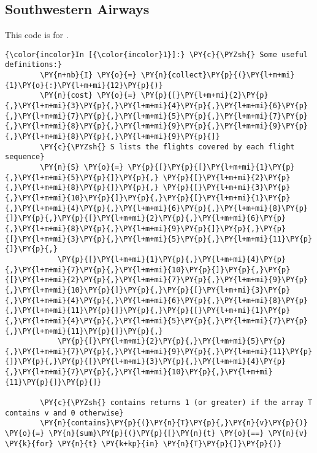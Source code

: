 \subsection{Southwestern Airways}
\label{code:southwestern-airways}
This code is for .

    \begin{Verbatim}[commandchars=\\\{\}]
{\color{incolor}In [{\color{incolor}1}]:} \PY{c}{\PYZsh{} Some useful definitions:}
        \PY{n+nb}{I} \PY{o}{=} \PY{n}{collect}\PY{p}{(}\PY{l+m+mi}{1}\PY{o}{:}\PY{l+m+mi}{12}\PY{p}{)}
        \PY{n}{cost} \PY{o}{=} \PY{p}{[}\PY{l+m+mi}{2}\PY{p}{,}\PY{l+m+mi}{3}\PY{p}{,}\PY{l+m+mi}{4}\PY{p}{,}\PY{l+m+mi}{6}\PY{p}{,}\PY{l+m+mi}{7}\PY{p}{,}\PY{l+m+mi}{5}\PY{p}{,}\PY{l+m+mi}{7}\PY{p}{,}\PY{l+m+mi}{8}\PY{p}{,}\PY{l+m+mi}{9}\PY{p}{,}\PY{l+m+mi}{9}\PY{p}{,}\PY{l+m+mi}{8}\PY{p}{,}\PY{l+m+mi}{9}\PY{p}{]}
        \PY{c}{\PYZsh{} S lists the flights covered by each flight sequence}
        \PY{n}{S} \PY{o}{=} \PY{p}{[}\PY{p}{[}\PY{l+m+mi}{1}\PY{p}{,}\PY{l+m+mi}{5}\PY{p}{]}\PY{p}{,} \PY{p}{[}\PY{l+m+mi}{2}\PY{p}{,}\PY{l+m+mi}{8}\PY{p}{]}\PY{p}{,} \PY{p}{[}\PY{l+m+mi}{3}\PY{p}{,}\PY{l+m+mi}{10}\PY{p}{]}\PY{p}{,}\PY{p}{[}\PY{l+m+mi}{1}\PY{p}{,}\PY{l+m+mi}{4}\PY{p}{,}\PY{l+m+mi}{6}\PY{p}{,}\PY{l+m+mi}{8}\PY{p}{]}\PY{p}{,}\PY{p}{[}\PY{l+m+mi}{2}\PY{p}{,}\PY{l+m+mi}{6}\PY{p}{,}\PY{l+m+mi}{8}\PY{p}{,}\PY{l+m+mi}{9}\PY{p}{]}\PY{p}{,}\PY{p}{[}\PY{l+m+mi}{3}\PY{p}{,}\PY{l+m+mi}{5}\PY{p}{,}\PY{l+m+mi}{11}\PY{p}{]}\PY{p}{,} 
            \PY{p}{[}\PY{l+m+mi}{1}\PY{p}{,}\PY{l+m+mi}{4}\PY{p}{,}\PY{l+m+mi}{7}\PY{p}{,}\PY{l+m+mi}{10}\PY{p}{]}\PY{p}{,}\PY{p}{[}\PY{l+m+mi}{2}\PY{p}{,}\PY{l+m+mi}{7}\PY{p}{,}\PY{l+m+mi}{9}\PY{p}{,}\PY{l+m+mi}{10}\PY{p}{]}\PY{p}{,}\PY{p}{[}\PY{l+m+mi}{3}\PY{p}{,}\PY{l+m+mi}{4}\PY{p}{,}\PY{l+m+mi}{6}\PY{p}{,}\PY{l+m+mi}{8}\PY{p}{,}\PY{l+m+mi}{11}\PY{p}{]}\PY{p}{,}\PY{p}{[}\PY{l+m+mi}{1}\PY{p}{,}\PY{l+m+mi}{4}\PY{p}{,}\PY{l+m+mi}{5}\PY{p}{,}\PY{l+m+mi}{7}\PY{p}{,}\PY{l+m+mi}{11}\PY{p}{]}\PY{p}{,}
            \PY{p}{[}\PY{l+m+mi}{2}\PY{p}{,}\PY{l+m+mi}{5}\PY{p}{,}\PY{l+m+mi}{7}\PY{p}{,}\PY{l+m+mi}{9}\PY{p}{,}\PY{l+m+mi}{11}\PY{p}{]}\PY{p}{,}\PY{p}{[}\PY{l+m+mi}{3}\PY{p}{,}\PY{l+m+mi}{4}\PY{p}{,}\PY{l+m+mi}{7}\PY{p}{,}\PY{l+m+mi}{10}\PY{p}{,}\PY{l+m+mi}{11}\PY{p}{]}\PY{p}{]}
        
        \PY{c}{\PYZsh{} contains returns 1 (or greater) if the array T contains v and 0 otherwise}
        \PY{n}{contains}\PY{p}{(}\PY{n}{T}\PY{p}{,}\PY{n}{v}\PY{p}{)} \PY{o}{=} \PY{n}{sum}\PY{p}{(}\PY{p}{[}\PY{n}{t} \PY{o}{==} \PY{n}{v} \PY{k}{for} \PY{n}{t} \PY{k+kp}{in} \PY{n}{T}\PY{p}{]}\PY{p}{)}
        

\end{Verbatim}
